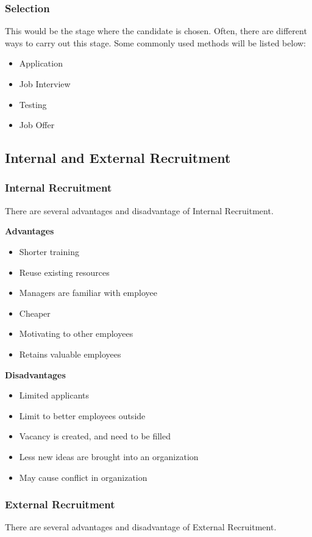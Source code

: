 \documentclass{standalone}
\begin{document}
\subsubsection{Selection}
This would be the stage where the candidate is chosen.
Often, there are different ways to carry out this stage.
Some commonly used methods will be listed below:
\begin{itemize}
	\item Application
	\item Job Interview
	\item Testing
	\item Job Offer
\end{itemize}

\subsection{Internal and External Recruitment}

\subsubsection{Internal Recruitment}
There are several advantages and disadvantage of Internal Recruitment.

\textbf{Advantages}\\
\begin{itemize}
	\item Shorter training
	\item Reuse existing resources
	\item Managers are familiar with employee
	\item Cheaper
	\item Motivating to other employees
	\item Retains valuable employees
\end{itemize}

\textbf{Disadvantages}\\
\begin{itemize}
	\item Limited applicants
	\item Limit to better employees outside
	\item Vacancy is created, and need to be filled
	\item Less new ideas are brought into an organization
	\item May cause conflict in organization
\end{itemize}

\subsubsection{External Recruitment}
There are several advantages and disadvantage of External Recruitment.
\end{document}
